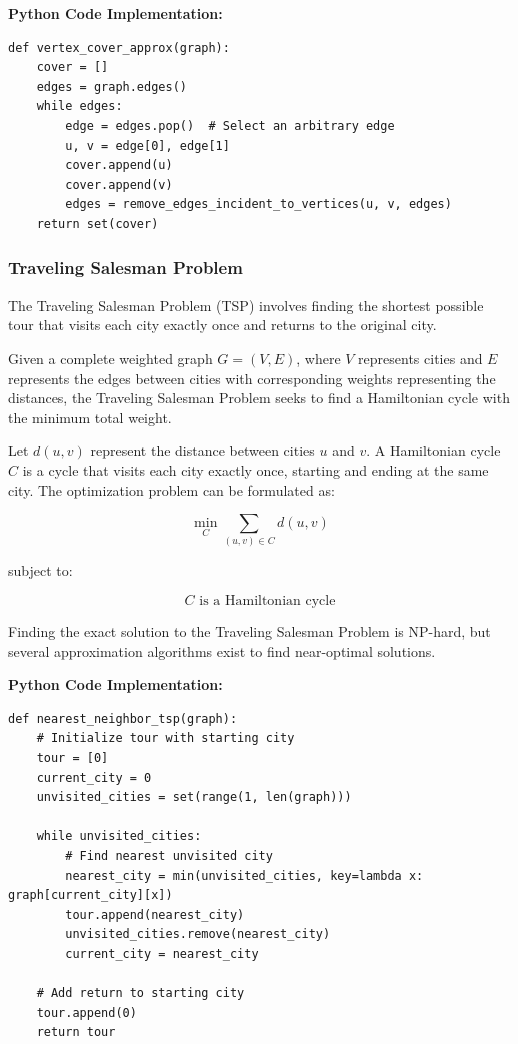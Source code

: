 \documentclass[12pt]{book} %
\begin{document}
\textbf{Python Code Implementation:}
\FloatBarrier
\begin{lstlisting}
def vertex_cover_approx(graph):
    cover = []
    edges = graph.edges()
    while edges:
        edge = edges.pop()  # Select an arbitrary edge
        u, v = edge[0], edge[1]
        cover.append(u)
        cover.append(v)
        edges = remove_edges_incident_to_vertices(u, v, edges)
    return set(cover)
\end{lstlisting}
\FloatBarrier

\subsubsection{Traveling Salesman Problem}
The Traveling Salesman Problem (TSP) involves finding the shortest possible tour that visits each city exactly once and returns to the original city.

Given a complete weighted graph \(G = (V, E)\), where \(V\) represents cities and \(E\) represents the edges between cities with corresponding weights representing the distances, the Traveling Salesman Problem seeks to find a Hamiltonian cycle with the minimum total weight.

Let \(d(u, v)\) represent the distance between cities \(u\) and \(v\). A Hamiltonian cycle \(C\) is a cycle that visits each city exactly once, starting and ending at the same city. The optimization problem can be formulated as:

\[
\min_{C} \sum_{(u, v) \in C} d(u, v)
\]

subject to:

\[
C \text{ is a Hamiltonian cycle}
\]

Finding the exact solution to the Traveling Salesman Problem is NP-hard, but several approximation algorithms exist to find near-optimal solutions.

\textbf{Python Code Implementation:}
\FloatBarrier
\begin{lstlisting}
def nearest_neighbor_tsp(graph):
    # Initialize tour with starting city
    tour = [0]
    current_city = 0
    unvisited_cities = set(range(1, len(graph)))
    
    while unvisited_cities:
        # Find nearest unvisited city
        nearest_city = min(unvisited_cities, key=lambda x: graph[current_city][x])
        tour.append(nearest_city)
        unvisited_cities.remove(nearest_city)
        current_city = nearest_city
    
    # Add return to starting city
    tour.append(0)
    return tour
\end{lstlisting}
\FloatBarrier
\end{document}
